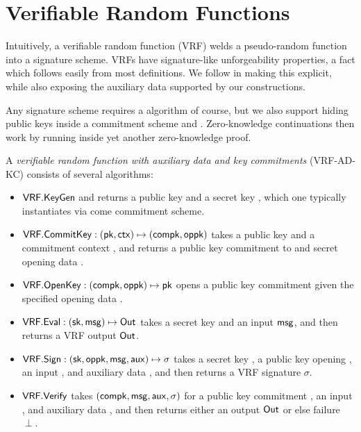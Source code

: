 
\section{Verifiable Random Functions}
\label{sec:vrf}

Intuitively, a verifiable random function (VRF) welds a pseudo-random function into a signature scheme.
%
VRFs have signature-like unforgeability properties, a fact which follows easily from most definitions. 
We follow \cite{agg_dkg} in making this explicit, while also
 exposing the auxiliary data supported by our constructions. 

Any signature scheme requires a \KeyGen algorithm of course, but we also
support hiding public keys inside a commitment scheme \CommitKey and \OpenKey.
Zero-knowledge continuations then work by running \OpenKey inside yet
another zero-knowledge proof. 

\begin{definition}
A {\em verifiable random function with auxiliary data and key commitments} (VRF-AD-KC) consists of several algorithms:
\begin{itemize}
\item ${\mathsf{VRF}}.{\mathsf{KeyGen}}$ and returns a public key \pk and a secret key \sk, which one typically instantiates via come commitment scheme. 
%
\item ${\mathsf{VRF}}.{\mathsf{CommitKey}} : (\mathsf{pk},\mathsf{ctx}) \mapsto (\mathsf{compk},\mathsf{oppk})$ takes a public key \pk and a commitment context \ctx, and returns a public key commitment \compk to \sk and secret opening data \openpk.
\item ${\mathsf{VRF}}.{\mathsf{OpenKey}} : (\mathsf{compk},\mathsf{oppk}) \mapsto \mathsf{pk}$ opens a public key commitment \compk given the specified opening data \openpk.
%
\item ${\mathsf{VRF}}.{\mathsf{Eval}} : (\mathsf{sk},\mathsf{msg}) \mapsto {\ensuremath{\mathsf{Out}}}$ takes a secret key \sk and an input $\mathsf{msg}$, and then returns a VRF output ${\mathsf{Out}}$.
\item ${\mathsf{VRF}}.{\mathsf{Sign}} : (\mathsf{sk},\mathsf{oppk},\mathsf{msg},\mathsf{aux}) \mapsto \sigma$ takes a secret key \sk, a public key opening \openpk, an input \msg, and auxiliary data \aux, and then returns a VRF signature $\sigma$.
\item ${\mathsf{VRF}}.{\mathsf{Verify}}$ takes $(\mathsf{compk},\mathsf{msg},\mathsf{aux},\sigma)$ for a public key commitment \compk, an input \msg, and auxiliary data \aux, and then returns either an output ${\mathsf{Out}}$ or else failure $\perp$.
\end{itemize}
\end{definition}

